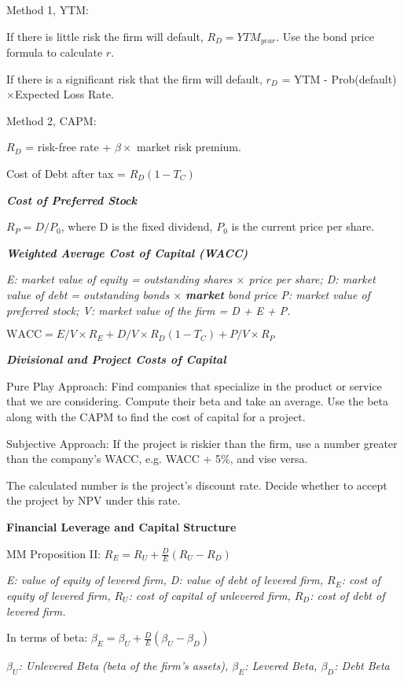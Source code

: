\documentclass{article}
\newcommand{\bigtitle}[1]{
	\noindent
	\textbf{#1}
}
\newcommand{\smalltitle}[1]{
	\noindent
	\textbf{\textit{#1}}
}
\begin{document}
Method 1, YTM:

If there is little risk the firm will default, $R_D = YTM_{year}$. Use the bond price formula to calculate $r$.

If there is a significant risk that the firm will default, $r_D$ = YTM - Prob(default)$\times$Expected Loss Rate.

Method 2, CAPM:

$R_D$ = risk-free rate + $\beta \times$ market risk premium.

Cost of Debt after tax = $R_D(1-T_C)$

\smalltitle{Cost of Preferred Stock}

$R_P=D/P_0$, where D is the fixed dividend, $P_0$ is the current price per share.

\smalltitle{Weighted Average Cost of Capital (WACC)}

\textit{E: market value of equity = outstanding shares $\times$ price per share; D: market value of debt = outstanding bonds $\times$ \textbf{market} bond price P: market value of preferred stock; V: market value of the firm = D + E + P.}

$\text{WACC} = E/V \times R_E + D/V \times R_D (1-T_C) + P/V \times R_P$

\smalltitle{Divisional and Project Costs of Capital}

Pure Play Approach: Find companies that specialize in the product or service that we are considering. Compute their beta and take an average. Use the beta along with the CAPM to find the cost of capital for a project.

Subjective Approach: If the project is riskier than the firm, use a number greater than the company's WACC, e.g. WACC + 5\%, and vise versa.

The calculated number is the project's discount rate. Decide whether to accept the project by NPV under this rate.

\bigtitle{Financial Leverage and Capital Structure}

MM Proposition II: $R_E = R_U + \frac{D}{E}(R_U-R_D)$

\textit{E: value of equity of levered firm, D: value of debt of levered firm, $R_E$: cost of equity of levered firm, $R_U$: cost of capital of unlevered firm, $R_D$: cost of debt of levered firm.}

In terms of beta:
$\beta _ { E } = \beta _ { U } + \frac { D } { E } \left( \beta _ { U } - \beta _ { D } \right)$

\textit{$\beta_U$: Unlevered Beta (beta of the firm's assets), $\beta_E$: Levered Beta, $\beta_D$: Debt Beta}
\end{document}
